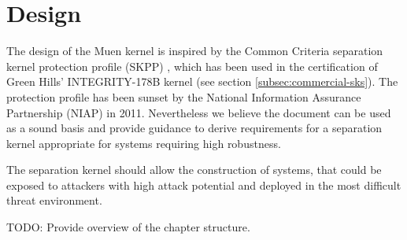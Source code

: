 \chapter{Design}
The design of the Muen kernel is inspired by the Common Criteria separation
kernel protection profile (SKPP) \cite{SKPP}, which has been used in the
certification of Green Hills' INTEGRITY-178B kernel (see section
\ref{subsec:commercial-sks}). The protection profile has been sunset by the
National Information Assurance Partnership (NIAP) in 2011. Nevertheless we
believe the document can be used as a sound basis and provide guidance to
derive requirements for a separation kernel appropriate for systems requiring
high robustness.

The separation kernel should allow the construction of systems, that could be
exposed to attackers with high attack potential and deployed in the most
difficult threat environment.

TODO: Provide overview of the chapter structure.





